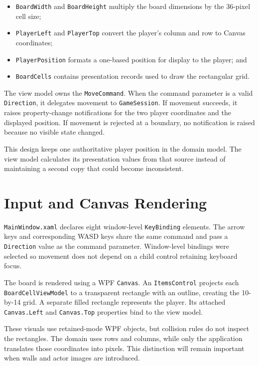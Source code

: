 \begin{itemize}
	\item \texttt{BoardWidth} and \texttt{BoardHeight} multiply the board dimensions by the 36-pixel cell size;
	\item \texttt{PlayerLeft} and \texttt{PlayerTop} convert the player's column and row to Canvas coordinates;
	\item \texttt{PlayerPosition} formats a one-based position for display to the player; and
	\item \texttt{BoardCells} contains presentation records used to draw the rectangular grid.
\end{itemize}

The view model owns the \texttt{MoveCommand}. When the command parameter is a valid \texttt{Direction}, it delegates movement to \texttt{GameSession}. If movement succeeds, it raises property-change notifications for the two player coordinates and the displayed position. If movement is rejected at a boundary, no notification is raised because no visible state changed.

This design keeps one authoritative player position in the domain model. The view model calculates its presentation values from that source instead of maintaining a second copy that could become inconsistent.

\section{Input and Canvas Rendering}

\texttt{MainWindow.xaml} declares eight window-level \texttt{KeyBinding} elements. The arrow keys and corresponding WASD keys share the same command and pass a \texttt{Direction} value as the command parameter. Window-level bindings were selected so movement does not depend on a child control retaining keyboard focus.

The board is rendered using a WPF \texttt{Canvas}. An \texttt{ItemsControl} projects each \texttt{BoardCellViewModel} to a transparent rectangle with an outline, creating the 10-by-14 grid. A separate filled rectangle represents the player. Its attached \texttt{Canvas.Left} and \texttt{Canvas.Top} properties bind to the view model.

These visuals use retained-mode WPF objects, but collision rules do not inspect the rectangles. The domain uses rows and columns, while only the application translates those coordinates into pixels. This distinction will remain important when walls and actor images are introduced.

